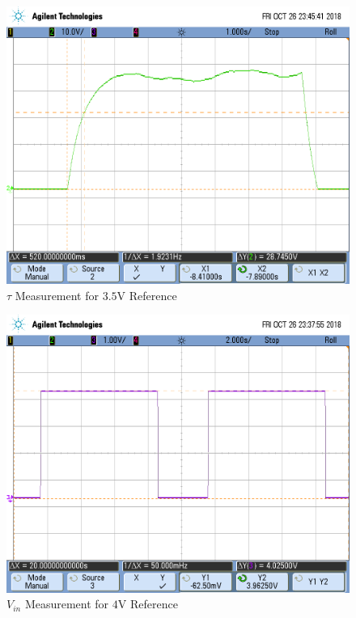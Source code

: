 \FloatBarrier

\FloatBarrier

\begin{figure}[h!]
	\centering
	\includegraphics[scale=0.75]{../images/scope_12.PNG}
	\caption{$\tau$ Measurement for $3.5$\si{\volt} Reference}
	\label{fig:scope_12}
\end{figure}

\FloatBarrier

\FloatBarrier

\begin{figure}[h!]
	\centering
	\includegraphics[scale=0.75]{../images/scope_6.PNG}
	\caption{$V_{in}$ Measurement for $4$\si{\volt} Reference}
	\label{fig:scope_6}
\end{figure}

